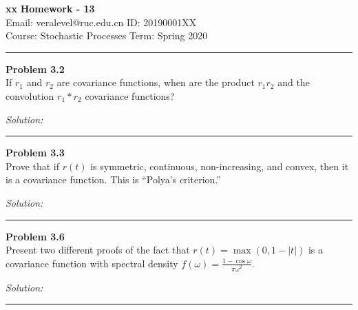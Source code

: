 \documentclass[a4paper, 11pt]{article}
\newenvironment{problem}[2][Problem]
    { \begin{mdframed}[backgroundcolor=gray!20] \textbf{#1 #2} \\}
    {  \end{mdframed}}
\newenvironment{solution}
    {\textit{Solution:}}
    {}
\begin{document}
\noindent
\large\textbf{xx} \hfill \textbf{Homework - 13}   \\
Email: veralevel@ruc.edu.cn \hfill ID: 20190001XX \\
\normalsize Course: Stochastic Processes \hfill Term: Spring 2020\\
\noindent\rule{7in}{2.8pt}
\begin{problem}{3.2}
If $r_1$ and $r_2$ are covariance functions, when are the product $r_1r_2$ and the convolution $r_1 * r_2$ covariance functions?
\end{problem}
\begin{solution}

\end{solution} 
\noindent\rule{7in}{2.8pt}


\begin{problem}{3.3}
Prove that if $r(t)$ is symmetric, continuous, non-increasing, and convex, then it is a covariance function. This is “Polya’s criterion.”
\end{problem}
\begin{solution}


\end{solution} 
%
\noindent\rule{7in}{2.8pt}

\begin{problem}{3.6}
Present two different proofs of the fact that $r(t)=\max (0,1-|t|)$ is a
covariance function with spectral density $f(\omega)=\frac{1-\cos \omega}{\pi \omega^{2}}$.
\end{problem}
\begin{solution}


\end{solution} 
%
\noindent\rule{7in}{2.8pt}
\end{document}
